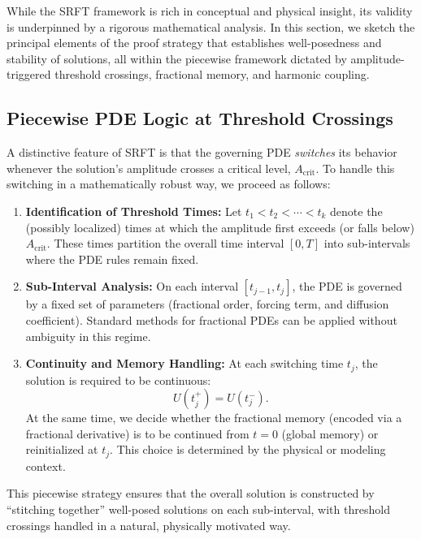 \documentclass[12pt]{article}
\begin{document}
While the SRFT framework is rich in conceptual and physical insight, its validity is underpinned by a rigorous mathematical analysis. In this section, we sketch the principal elements of the proof strategy that establishes well-posedness and stability of solutions, all within the piecewise framework dictated by amplitude-triggered threshold crossings, fractional memory, and harmonic coupling.

\medskip

\subsection{Piecewise PDE Logic at Threshold Crossings}
A distinctive feature of SRFT is that the governing PDE \emph{switches} its behavior whenever the solution's amplitude crosses a critical level, $A_{\mathrm{crit}}$. To handle this switching in a mathematically robust way, we proceed as follows:

\begin{enumerate}
    \item \textbf{Identification of Threshold Times:}  
          Let $t_1 < t_2 < \cdots < t_k$ denote the (possibly localized) times at which the amplitude first exceeds (or falls below) $A_{\mathrm{crit}}$. These times partition the overall time interval $[0,T]$ into sub-intervals where the PDE rules remain fixed.
          
    \item \textbf{Sub-Interval Analysis:}  
          On each interval $[t_{j-1},t_j]$, the PDE is governed by a fixed set of parameters (fractional order, forcing term, and diffusion coefficient). Standard methods for fractional PDEs can be applied without ambiguity in this regime.
          
    \item \textbf{Continuity and Memory Handling:}  
          At each switching time $t_j$, the solution is required to be continuous:
          \[
            U(t_j^+) = U(t_j^-).
          \]
          At the same time, we decide whether the fractional memory (encoded via a fractional derivative) is to be continued from $t=0$ (global memory) or reinitialized at $t_j$. This choice is determined by the physical or modeling context.
\end{enumerate}

This piecewise strategy ensures that the overall solution is constructed by “stitching together” well-posed solutions on each sub-interval, with threshold crossings handled in a natural, physically motivated way.
\end{document}
